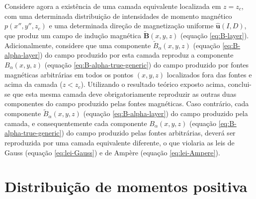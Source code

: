 Considere agora a existência de uma camada equivalente localizada em $z = z_{c}$, com uma determinada 
distribuição de intensidades de momento magnético $p(x'', y'', z_{c})$ e uma determinada 
direção de magnetização uniforme $\hat{\mathbf{u}}(I, D)$, que produz um campo de indução 
magnética $\tilde{\mathbf{B}}(x, y, z)$ (equação \ref{eq:B-layer}). Adicionalmente, 
considere que uma componente $\tilde{B}_{\alpha}(x, y, z)$ (equação \ref{eq:B-alpha-layer}) 
do campo produzido por esta camada reproduz a componente $B_{\alpha}(x, y, z)$ (equação \ref{eq:B-alpha-true-generic}) 
do campo produzido por fontes magnéticas arbitrárias em todos os pontos $(x, y, z)$ localizados fora das fontes e acima 
da camada ($z < z_{c}$). Utilizando o resultado teórico exposto acima, conclui-se que 
esta mesma camada deve obrigatoriamente reproduzir as outras duas componentes do campo produzido 
pelas fontes magnéticas. Caso contrário, cada componente $\tilde{B}_{\alpha}(x, y, z)$ 
(equação \ref{eq:B-alpha-layer}) do campo produzido pela camada, e consequentemente cada componente 
$B_{\alpha}(x, y, z)$ (equação \ref{eq:B-alpha-true-generic}) do campo produzido pelas fontes arbitrárias, 
deverá ser reproduzida por uma camada equivalente diferente, o que violaria as leis de 
Gauss (equação \ref{eq:lei-Gauss}) e de Ampère (equação \ref{eq:lei-Ampere}).


\section{Distribuição de momentos positiva}
\label{sec:distribuicao-positiva}


